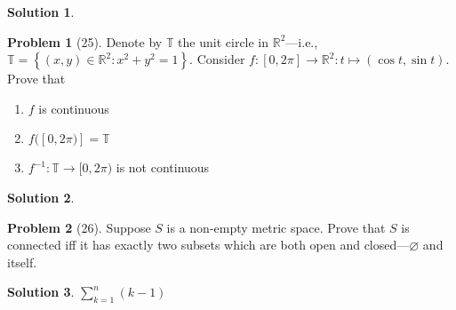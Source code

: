 \documentclass[12pt]{article}
\theoremstyle{definition} %
\newtheorem{solution}{Solution}
\newtheorem{problem}{Problem}
\theoremstyle{plain} %
\begin{document}
\begin{solution}
    
\end{solution}
\begin{problem}[25]
    Denote by $\mathbb{{T}}$ the unit circle in $\mathbb{{R}}^{2}$—i.e.,$\mathbb{{T}}=\left\{ (x,y)\in \mathbb{{R}}^{2}:x^{2}+y^{2}=1 \right\} $. Consider $f:[0,2\pi]\to \mathbb{{R}}^{2}: t\mapsto (\cos t, \sin t)$. Prove that
    \begin{enumerate}
        \item $f$ is continuous
        \item $f([0,2\pi)]=\mathbb{{T}}$
        \item $f^{-1}:\mathbb{{T}}\to [0,2\pi)$ is not continuous  
    \end{enumerate}   
\end{problem}
\begin{solution}
    
\end{solution}
\begin{problem}[26]
   Suppose $S$ is a non-empty metric space. Prove that $S$ is connected iff it has exactly two subsets which are both open and closed—$\varnothing $ and itself. 
\end{problem}
\begin{solution}
   $\sum_{k=1}^{n} (k-1)$  
\end{solution}
\end{document}
